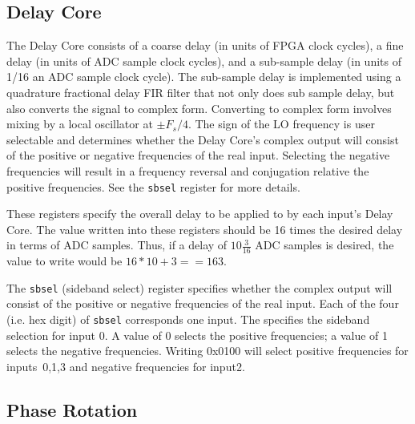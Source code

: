 \documentclass[12pt]{article}
\begin{document}
  \subsection{Delay Core}

The Delay Core consists of a coarse delay (in units of FPGA clock cycles), a
fine delay (in units of ADC sample clock cycles), and a sub-sample delay (in
units of 1/16 an ADC sample clock cycle).  The sub-sample delay is implemented
using a quadrature fractional delay FIR filter that not only does sub sample
delay, but also converts the signal to complex form.  Converting to complex
form involves mixing by a local oscillator at $\pm F_s/4$.  The sign of the LO
frequency is user selectable and determines whether the Delay Core's complex
output will consist of the positive or negative frequencies of the real input.
Selecting the negative frequencies will result in a frequency reversal and
conjugation relative the positive frequencies.  See the \verb|sbsel| register
for more details.

\begin{description}

{}
 These registers specify the overall delay to be applied to by
each input's Delay Core.  The value written into these registers should be 16
times the desired delay in terms of ADC samples.  Thus, if a delay of $10
\frac{3}{16}$ ADC samples is desired, the value to write would be $16 * 10 + 3
== 163$.

\end{description}

\begin{description}

 The \verb|sbsel| (sideband select) register specifies whether the
complex output will consist of the positive or negative frequencies of the real
input.  Each of the four \LSns (i.e. hex digit) of \verb|sbsel| corresponds one
input.  The \LSn specifies the sideband selection for input 0.  A value of 0
selects the positive frequencies; a value of 1 selects the negative
frequencies.  Writing 0x0100 will select positive frequencies for inputs~0,1,3
and negative frequencies for input2.

\end{description}

  \subsection{Phase Rotation}
\end{document}
